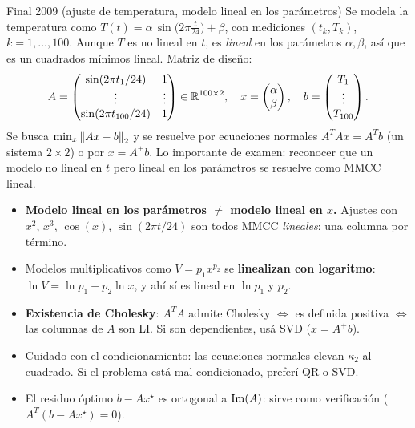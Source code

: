 \begin{ejemplo}{Final 2009 (ajuste de temperatura, modelo lineal en los parámetros)}
Se modela la temperatura como $T(t)=\alpha\,\sin\!\big(2\pi\tfrac{t}{24}\big)+\beta$, con mediciones $(t_k,T_k)$, $k=1,\dots,100$. Aunque $T$ es no lineal en $t$, es \emph{lineal} en los parámetros $\alpha,\beta$, así que es un cuadrados mínimos lineal. Matriz de diseño:
\[
A=\begin{pmatrix} \sin(2\pi t_1/24) & 1 \\ \vdots & \vdots \\ \sin(2\pi t_{100}/24) & 1 \end{pmatrix}\in\mathbb{R}^{100\times2},
\quad
x=\begin{pmatrix}\alpha\\\beta\end{pmatrix},
\quad
b=\begin{pmatrix} T_1\\\vdots\\T_{100}\end{pmatrix}.
\]
Se busca $\min_x\left\lVert Ax-b \right\rVert_2$ y se resuelve por ecuaciones normales $A^TAx=A^Tb$ (un sistema $2\times2$) o por $x=A^{+}b$. Lo importante de examen: reconocer que un modelo no lineal en $t$ pero lineal en los parámetros se resuelve como MMCC lineal.
\end{ejemplo}

\begin{truco}
\begin{itemize}
\item \textbf{Modelo lineal en los parámetros $\ne$ modelo lineal en $x$.} Ajustes con $x^2$, $x^3$, $\cos(x)$, $\sin(2\pi t/24)$ son todos MMCC \emph{lineales}: una columna por término.
\item Modelos multiplicativos como $V=p_1 x^{p_2}$ se \textbf{linealizan con logaritmo}: $\ln V=\ln p_1+p_2\ln x$, y ahí sí es lineal en $\ln p_1$ y $p_2$.
\item \textbf{Existencia de Cholesky}: $A^TA$ admite Cholesky $\iff$ es definida positiva $\iff$ las columnas de $A$ son LI. Si son dependientes, usá SVD ($x=A^+b$).
\item Cuidado con el condicionamiento: las ecuaciones normales elevan $\kappa_2$ al cuadrado. Si el problema está mal condicionado, preferí QR o SVD.
\item El residuo óptimo $b-Ax^\star$ es ortogonal a $\operatorname{Im}(A)$: sirve como verificación ($A^T(b-Ax^\star)=0$).
\end{itemize}
\end{truco}
